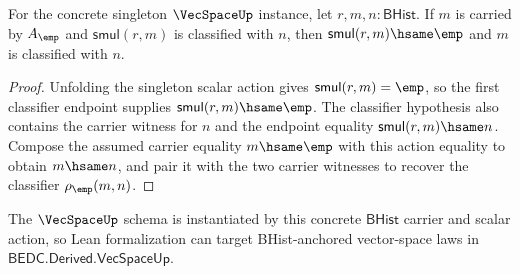 \begin{theorem}
\label{thm:vecspace-singleton-smul-empty-result-readback}
For the concrete singleton $\VecSpaceUp$ instance, let
$r,m,n:\mathsf{BHist}$. If $m$ is carried by $A_{\emp}$ and
$\mathsf{smul}(r,m)$ is classified with $n$, then
$\mathsf{smul}(r,m)\hsame\emp$ and $m$ is classified with $n$.
\end{theorem}
\begin{proof}
Unfolding the singleton scalar action gives
$\mathsf{smul}(r,m)=\emp$, so the first classifier endpoint supplies
$\mathsf{smul}(r,m)\hsame\emp$. The classifier hypothesis also contains the
carrier witness for $n$ and the endpoint equality
$\mathsf{smul}(r,m)\hsame n$. Compose the assumed carrier equality
$m\hsame\emp$ with this action equality to obtain $m\hsame n$, and pair it
with the two carrier witnesses to recover the classifier $\rho_{\emp}(m,n)$.
\end{proof}

The $\VecSpaceUp$ schema is instantiated by this concrete $\mathsf{BHist}$
carrier and scalar action, so Lean formalization can target BHist-anchored
vector-space laws in $\mathsf{BEDC.Derived.VecSpaceUp}$.


